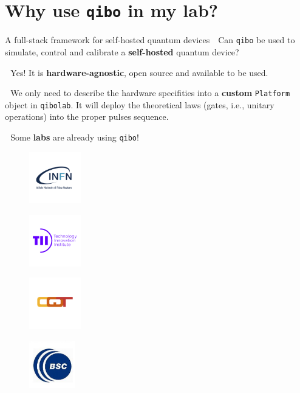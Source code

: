 \documentclass[8pt, xcolor={svgnames}, hyperref={colorlinks,linkcolor=black, citecolor=amethyst, urlcolor=amethyst}]{beamer}
\begin{document}
\section{Why use \texttt{qibo} in my lab?}


\begin{frame}{A full-stack framework for self-hosted quantum devices}
\large 
\faArrowCircleRight\,\, Can \texttt{qibo} be used to simulate, control and calibrate
a \textbf{self-hosted} quantum device?

\pause

\faArrowCircleRight\,\, Yes! It is \textbf{hardware-agnostic}, open source and 
available to be used. 

\pause

\faArrowCircleRight\,\, We only need to describe the hardware specifities into a 
\textbf{custom} \texttt{Platform} object in \texttt{qibolab}.  
It will deploy the theoretical laws (gates, i.e., unitary operations) into the 
proper pulses sequence.

\pause

\faArrowCircleRight\,\, Some \textbf{labs} are already using \texttt{qibo}!

\begin{multicols}{4}
\begin{figure}
    \centering 
    \includegraphics[width=0.2\textwidth]{figures/infn.png}
\end{figure}
\begin{figure}
    \centering 
    \includegraphics[width=0.2\textwidth]{figures/tii.png}
\end{figure}
\begin{figure}
    \centering 
    \includegraphics[width=0.2\textwidth]{figures/cqt.png}
\end{figure}
\begin{figure}
    \centering 
    \includegraphics[width=0.18\textwidth]{figures/bsc.jpg}
\end{figure}
\end{multicols}


\end{frame}
\end{document}
